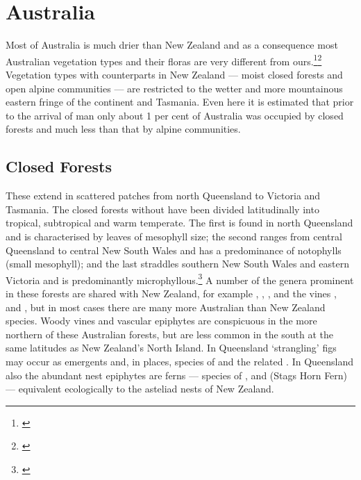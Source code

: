 \section{Australia}

Most of Australia is much drier than New Zealand and as a consequence most Australian vegetation types and their floras are very different from ours.\footnote{\cite{beadle1981vegetation}}\footnote{\cite{groves1981australian}} Vegetation types with counterparts in New Zealand --- moist closed forests and open alpine communities --- are restricted to the wetter and more mountainous eastern fringe of the continent and Tasmania.
Even here it is estimated that prior to the arrival of man only about 1 per cent of Australia was occupied by closed forests and much less than that by alpine communities.

\subsection{Closed Forests}

These extend in scattered patches from north Queensland to Victoria and Tasmania.
The closed forests without  have been divided latitudinally into tropical, subtropical and warm temperate.
The first is found in north Queensland and is characterised by leaves of mesophyll size; the second ranges from central Queensland to central New South Wales and has a predominance of notophylls (small mesophyll); and the last straddles southern New South Wales and eastern Victoria and is predominantly microphyllous.\footnote{\cite{webb1959physiognomic}}
A number of the genera prominent in these forests are shared with New Zealand, for example , , ,  and the vines ,  and , but in most cases there are many more Australian than New Zealand species.
Woody vines and vascular epiphytes are conspicuous in the more northern of these Australian forests, but are less common in the south at the same latitudes as New Zealand's North Island.
In Queensland `strangling' figs may occur as emergents and, in places, species of  and the related .
In Queensland also the abundant nest epiphytes are ferns --- species of ,  and  (Stags Horn Fern) --- equivalent ecologically to the asteliad nests of New Zealand.


